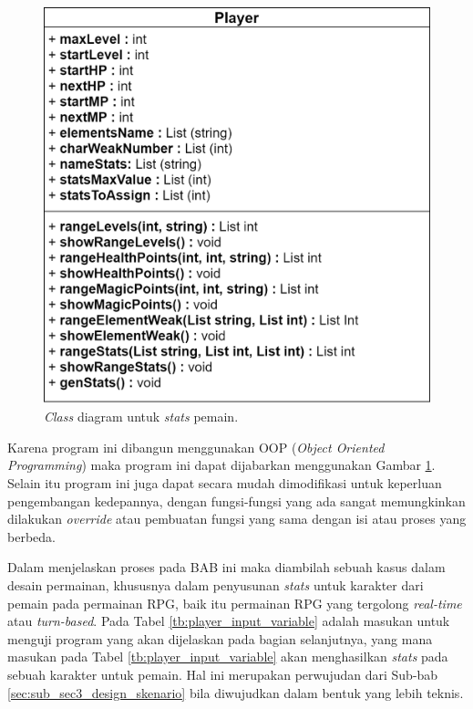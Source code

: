\begin{figure} [!h] \centering
	\includegraphics[scale=0.28]{img/player_uml.png}
	\caption{\textit{Class} diagram untuk \textit{stats} pemain.}
	\label{fig:player_uml}
\end{figure}

Karena program ini dibangun menggunakan OOP (\textit{Object Oriented Programming}) maka program ini dapat dijabarkan menggunakan Gambar \ref{fig:player_uml}. Selain itu program ini juga dapat secara mudah dimodifikasi untuk keperluan pengembangan kedepannya, dengan fungsi-fungsi yang ada sangat memungkinkan dilakukan \textit{override} atau pembuatan fungsi yang sama dengan isi atau proses yang berbeda.
\vspace{1ex}

Dalam menjelaskan proses pada BAB ini maka diambilah sebuah kasus dalam desain permainan, khususnya dalam penyusunan \textit{stats} untuk karakter dari pemain pada permainan RPG, baik itu permainan RPG yang tergolong \textit{real-time} atau \textit{turn-based}. Pada Tabel \ref{tb:player_input_variable} adalah masukan untuk menguji program yang akan dijelaskan pada bagian selanjutnya, yang mana masukan pada Tabel \ref{tb:player_input_variable} akan menghasilkan \textit{stats} pada sebuah karakter untuk pemain. Hal ini merupakan perwujudan dari Sub-bab \ref{sec:sub_sec3_design_skenario} bila diwujudkan dalam bentuk yang lebih teknis.
\vspace{-1ex}

